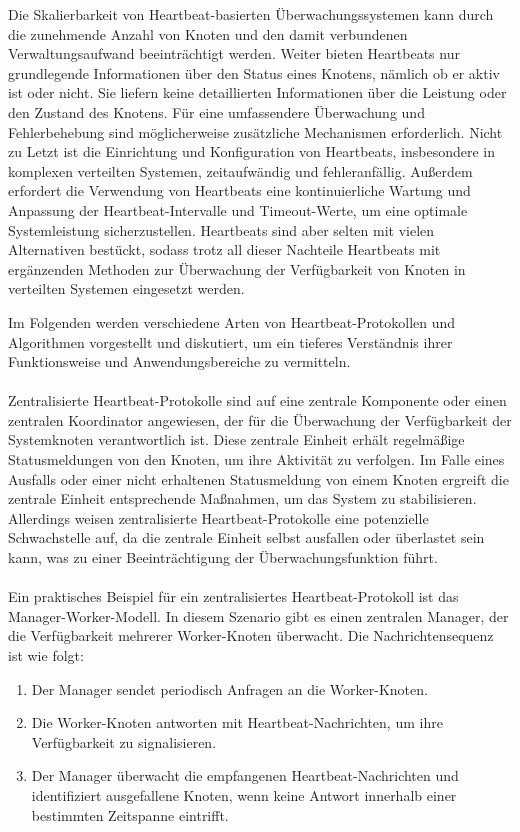 \documentclass[../vs-script-first-v01.tex]{subfiles}
\begin{document}
Die Skalierbarkeit von Heartbeat-basierten Überwachungssystemen kann durch die zunehmende Anzahl von Knoten und den damit verbundenen Verwaltungsaufwand beeinträchtigt werden. Weiter bieten Heartbeats nur grundlegende Informationen über den Status eines Knotens, nämlich ob er aktiv ist oder nicht. Sie liefern keine detaillierten Informationen über die Leistung oder den Zustand des Knotens. Für eine umfassendere Überwachung und Fehlerbehebung sind möglicherweise zusätzliche Mechanismen erforderlich.
Nicht zu Letzt ist die  Einrichtung und Konfiguration von Heartbeats, insbesondere in komplexen verteilten Systemen, zeitaufwändig und fehleranfällig. Außerdem erfordert die Verwendung von Heartbeats eine kontinuierliche Wartung und Anpassung der Heartbeat-Intervalle und Timeout-Werte, um eine optimale Systemleistung sicherzustellen. 
Heartbeats sind aber selten mit vielen Alternativen bestückt, sodass trotz all dieser Nachteile Heartbeats mit ergänzenden Methoden zur Überwachung der Verfügbarkeit von Knoten in verteilten Systemen eingesetzt werden. 

Im Folgenden werden verschiedene Arten von Heartbeat-Protokollen und Algorithmen vorgestellt und diskutiert, um ein tieferes Verständnis ihrer Funktionsweise und Anwendungsbereiche zu vermitteln.
\\\\
Zentralisierte Heartbeat-Protokolle sind auf eine zentrale Komponente oder einen zentralen Koordinator angewiesen, der für die Überwachung der Verfügbarkeit der Systemknoten verantwortlich ist. Diese zentrale Einheit erhält regelmäßige Statusmeldungen von den Knoten, um ihre Aktivität zu verfolgen. Im Falle eines Ausfalls oder einer nicht erhaltenen Statusmeldung von einem Knoten ergreift die zentrale Einheit entsprechende Maßnahmen, um das System zu stabilisieren. Allerdings weisen zentralisierte Heartbeat-Protokolle eine potenzielle Schwachstelle auf, da die zentrale Einheit selbst ausfallen oder überlastet sein kann, was zu einer Beeinträchtigung der Überwachungsfunktion führt.
\\\\
Ein praktisches Beispiel für ein zentralisiertes Heartbeat-Protokoll ist das Manager-Worker-Modell. In diesem Szenario gibt es einen zentralen Manager, der die Verfügbarkeit mehrerer Worker-Knoten überwacht. Die Nachrichtensequenz ist wie folgt:
\begin{enumerate}[label=(\alph*)]
\item Der Manager sendet periodisch Anfragen an die Worker-Knoten.
\item Die Worker-Knoten antworten mit Heartbeat-Nachrichten, um ihre Verfügbarkeit zu signalisieren.
\item Der Manager überwacht die empfangenen Heartbeat-Nachrichten und identifiziert ausgefallene Knoten, wenn keine Antwort innerhalb einer bestimmten Zeitspanne eintrifft.
\end{enumerate}
\end{document}
